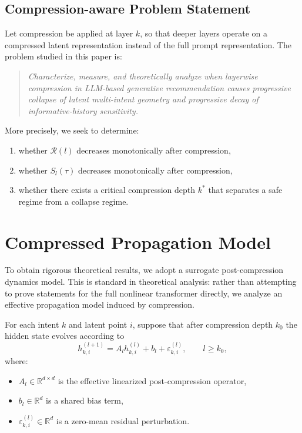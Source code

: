 \documentclass[11pt]{article}
\newcommand{\R}{\mathbb{R}}
\begin{document}
\subsection{Compression-aware Problem Statement}

Let compression be applied at layer $k$, so that deeper layers operate on a compressed latent representation instead of the full prompt representation. The problem studied in this paper is:

\begin{quote}
\emph{Characterize, measure, and theoretically analyze when layerwise compression in LLM-based generative recommendation causes progressive collapse of latent multi-intent geometry and progressive decay of informative-history sensitivity.}
\end{quote}

More precisely, we seek to determine:
\begin{enumerate}[label=(\roman*)]
    \item whether $\mathcal{R}(l)$ decreases monotonically after compression,
    \item whether $S_l(\tau)$ decreases monotonically after compression,
    \item whether there exists a critical compression depth $k^*$ that separates a safe regime from a collapse regime.
\end{enumerate}

\section{Compressed Propagation Model}

To obtain rigorous theoretical results, we adopt a surrogate post-compression dynamics model. This is standard in theoretical analysis: rather than attempting to prove statements for the full nonlinear transformer directly, we analyze an effective propagation model induced by compression.

For each intent $k$ and latent point $i$, suppose that after compression depth $k_0$ the hidden state evolves according to
\[
h_{k,i}^{(l+1)} = A_l h_{k,i}^{(l)} + b_l + \varepsilon_{k,i}^{(l)},
\qquad l \ge k_0,
\]
where:
\begin{itemize}
    \item $A_l \in \R^{d \times d}$ is the effective linearized post-compression operator,
    \item $b_l \in \R^d$ is a shared bias term,
    \item $\varepsilon_{k,i}^{(l)} \in \R^d$ is a zero-mean residual perturbation.
\end{itemize}
\end{document}
